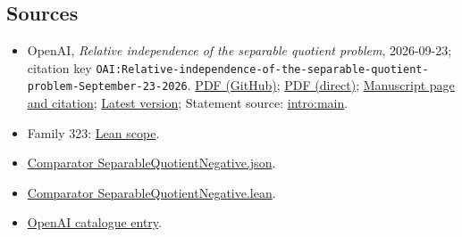 \documentclass[11pt]{article}
\begin{document}
\subsection{Sources}
\begin{itemize}
\item OpenAI, \emph{Relative independence of the separable quotient problem}, 2026-09-23; citation key \texttt{OAI:Relative-independence-of-the-separable-quotient-problem-September-23-2026}. \href{https://github.com/openai/math/blob/adc7f1241b42e322a6451854ab7e4b4c146bf78a/preprints/Relative-independence-of-the-separable-quotient-problem-September-23-2026/paper.pdf}{PDF (GitHub)}; \href{https://github.com/openai/math/raw/adc7f1241b42e322a6451854ab7e4b4c146bf78a/preprints/Relative-independence-of-the-separable-quotient-problem-September-23-2026/paper.pdf}{PDF (direct)}; \href{https://github.com/openai/math/blob/adc7f1241b42e322a6451854ab7e4b4c146bf78a/preprints/Relative-independence-of-the-separable-quotient-problem-September-23-2026/README.md}{Manuscript page and citation}; \href{https://github.com/openai/math/blob/main/preprints/Relative-independence-of-the-separable-quotient-problem-September-23-2026/paper.pdf}{Latest version}; Statement source: \href{https://github.com/openai/math/blob/adc7f1241b42e322a6451854ab7e4b4c146bf78a/preprints/Relative-independence-of-the-separable-quotient-problem-September-23-2026/build/sections/introduction.tex\#L34}{intro:main}.
\item Family 323: \href{https://github.com/openai/math/blob/adc7f1241b42e322a6451854ab7e4b4c146bf78a/lean/docs/323.md}{Lean scope}.
\item \href{https://github.com/openai/math/blob/adc7f1241b42e322a6451854ab7e4b4c146bf78a/lean/ComparatorChallenges/SeparableQuotientNegative.json}{Comparator SeparableQuotientNegative.json}.
\item \href{https://github.com/openai/math/blob/adc7f1241b42e322a6451854ab7e4b4c146bf78a/lean/ComparatorChallenges/SeparableQuotientNegative.lean}{Comparator SeparableQuotientNegative.lean}.
\item \href{https://github.com/openai/math/blob/adc7f1241b42e322a6451854ab7e4b4c146bf78a/CONTENTS.md}{OpenAI catalogue entry}.
\end{itemize}
\end{document}
